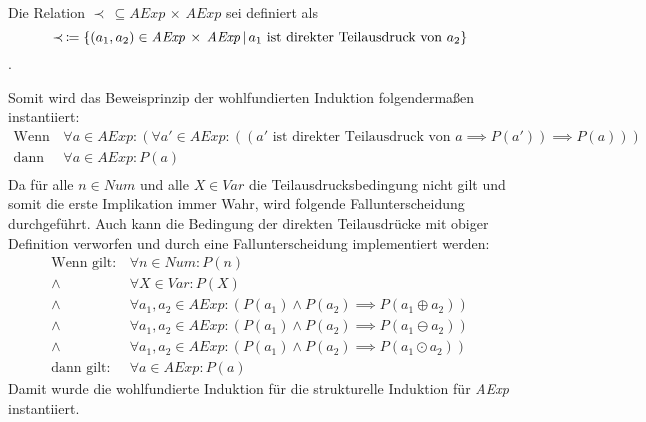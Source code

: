 					Die Relation $ \prec \,\subseteq \textit{AExp} \,\times\, \textit{AExp} $ sei definiert als \[ \prec \,\coloneqq \{ (a _ 1, a _ 2) \in \textit{AExp} \,\times\, \textit{AExp} \,\vert\, a _ 1 \text{ ist direkter Teilausdruck von } a _ 2 \} \].

					Somit wird das Beweisprinzip der wohlfundierten Induktion folgendermaßen instantiiert:
					\begin{align*}
						\text{Wenn gilt:} & \,\forall a \in \textit{AExp} : (\forall a' \in \textit{AExp} : ((a' \text{ ist direkter Teilausdruck von } a \implies P(a')) \implies P(a))) \\
						\text{dann gilt:} & \,\forall a \in \textit{AExp} : P(a)                                                                                                          \\
					\end{align*}
					Da für alle $ n \in \textit{Num} $ und alle $ X \in \textit{Var} $ die Teilausdrucksbedingung nicht gilt und somit die erste Implikation immer Wahr, wird folgende Fallunterscheidung durchgeführt. Auch kann die Bedingung der direkten Teilausdrücke mit obiger Definition verworfen und durch eine Fallunterscheidung implementiert werden:
					\begin{align*}
						\text{Wenn gilt:} & \,\forall n \in \textit{Num} : P(n) \tag{$ n $ hat keine direkte Teilausdrücke}                                                              \\
						\land             & \,\forall X \in \textit{Var} : P(X) \tag{$ X $ hat keine direkte Teilausdrücke}                                                              \\
						\land             & \,\forall a _ 1, a _ 2 \in \textit{AExp} : (P(a _ 1) \land P(a _ 2) \implies P(a _ 1 \oplus a _ 2)) \tag{1. Fall für direkte Teilausdrücke}  \\
						\land             & \,\forall a _ 1, a _ 2 \in \textit{AExp} : (P(a _ 1) \land P(a _ 2) \implies P(a _ 1 \ominus a _ 2)) \tag{2. Fall für direkte Teilausdrücke} \\
						\land             & \,\forall a _ 1, a _ 2 \in \textit{AExp} : (P(a _ 1) \land P(a _ 2) \implies P(a _ 1 \odot a _ 2)) \tag{3. Fall für direkte Teilausdrücke}   \\
						\text{dann gilt:} & \,\forall a \in \textit{AExp} : P(a)
					\end{align*}
					Damit wurde die wohlfundierte Induktion für die strukturelle Induktion für \textit{AExp} instantiiert.

